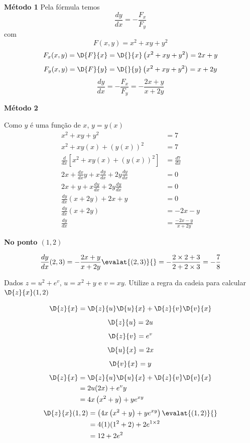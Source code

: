 \documentclass[a4paper,12pt,fleqn]{article}
\begin{document}
\begin{answer}
  \textbf{Método 1}
  Pela fórmula temos
  \[
    \frac{dy}{dx} = - \frac{F_x}{F_y}
  \]
  com
  \[
    F(x, y) = x^2 + xy + y^2
  \]
  \[
    F_x(x, y)
    = \D{F}{x}
    = \D{}{x}\left(x^2 + xy + y^2\right)
    = 2x + y
  \]
  \[
    F_y(x, y)
    = \D{F}{y}
    = \D{}{y}\left(x^2 + xy + y^2\right)
    = x + 2y
  \]
  \[
    \frac{dy}{dx}
    = -\frac{F_x}{F_y}
    = -\frac{2x + y}{x + 2y}
  \]

  \textbf{Método 2}

  Como $y$ é uma função de $x$,
  \(
    y = y(x)
  \)
  \begin{align*}
    x^2 + xy + y^2                                                & = 7                  \\
    x^2 + xy(x) + \left(y(x)\right)^2                             & = 7                  \\
    \frac{d}{dx} \left[ x^2 + xy(x) + \left(y(x)\right)^2 \right] & = \frac{d7}{dx}      \\
    2x + \frac{dx}{dx}y + x\frac{dy}{dx} + 2y\frac{dy}{dx}        & = 0                  \\
    2x + y + x\frac{dy}{dx} + 2y\frac{dy}{dx}                     & = 0                  \\
    \frac{dy}{dx}\left(x + 2y\right) + 2x + y                     & = 0                  \\
    \frac{dy}{dx}\left(x + 2y\right)                              & = - 2x - y           \\
    \frac{dy}{dx}                                                 & = \frac{-2x-y}{x+2y}
  \end{align*}

  \textbf{No ponto $(1,2)$}

  \[
    \frac{dy}{dx}(2, 3)
    = -\frac{2x + y}{x + 2y} \evalat{(2, 3)}{}
    = -\frac{2\times 2 + 3}{2 + 2 \times 3}
    = -\frac{7}{8}
  \]
\end{answer}

Dados
$
  z=u^2+e^v
$,
$
  u=x^2+y
$ e
$
  v=xy
$.
Utilize a regra da cadeia para calcular
\(
  \D{z}{x}(1, 2)
\)
\begin{answer}
\[
  \D{z}{x} = \D{z}{u} \D{u}{x} + \D{z}{v} \D{v}{x}
\]
\[
  \D{z}{u} = 2u
\]
\[
  \D{z}{v} = e^v
\]
\[
  \D{u}{x} = 2x
\]
\[
  \D{v}{x} = y
\]
\begin{align*}
  \D{z}{x}
  & = \D{z}{u} \D{u}{x} + \D{z}{v} \D{v}{x} \\
  & = 2u(2x) + e^v y                  \\
  & = 4x\left(x^2 + y\right)+ye^{xy}
\end{align*}
\begin{align*}
  \D{z}{x}(1, 2)
  & = \left(4x\left(x^2 + y\right)+ye^{xy}\right) \evalat{(1, 2)}{} \\
  & = 4(1)(1^2+2)+2e^{1 \times 2} \\
  & = 12+2e^2
\end{align*}
\end{answer}

\end{document}
